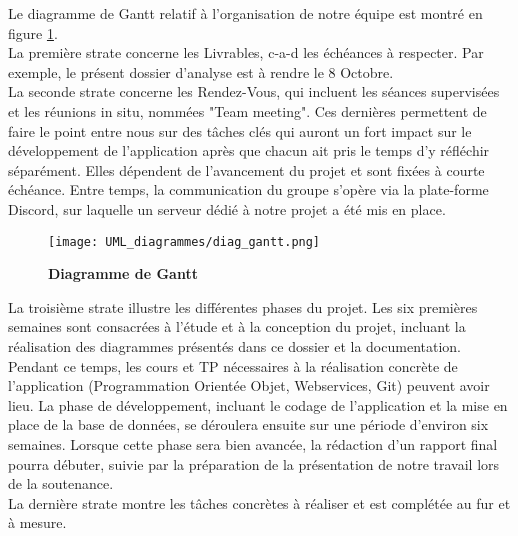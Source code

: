 \documentclass[11pt]{article}
\begin{document}
\bigbreak

Le diagramme de Gantt relatif à l'organisation de notre équipe est montré en figure \ref{UML_gantt}.\\

La première strate concerne les Livrables, c-a-d les échéances à respecter. Par exemple, le présent dossier d'analyse est à rendre le 8 Octobre.\\

La seconde strate concerne les Rendez-Vous, qui incluent les séances supervisées et les réunions in situ, nommées "Team meeting". Ces dernières permettent de faire le point entre nous sur des tâches clés qui auront un fort impact sur le développement de l'application après que chacun ait pris le temps d'y réfléchir séparément. Elles dépendent de l'avancement du projet et sont fixées à courte échéance. Entre temps, la communication du groupe s'opère via la plate-forme Discord, sur laquelle un serveur dédié à notre projet a été mis en place.\\

\begin{figure}[H]
    \caption{\textbf{Diagramme de Gantt}}
    \label{UML_gantt}
    \centering
    \texttt{[image: UML\_diagrammes/diag\_gantt.png]}
\end{figure}

La troisième strate illustre les différentes phases du projet. Les six premières semaines sont consacrées à l'étude et à la conception du projet, incluant la réalisation des diagrammes présentés dans ce dossier et la documentation. Pendant ce temps, les cours et TP nécessaires à la réalisation concrète de l'application (Programmation Orientée Objet, Webservices, Git) peuvent avoir lieu. La phase de développement, incluant le codage de l'application et la mise en place de la base de données, se déroulera ensuite sur une période d'environ six semaines. Lorsque cette phase sera bien avancée, la rédaction d'un rapport final pourra débuter, suivie par la préparation de la présentation de notre travail lors de la soutenance.\\

La dernière strate montre les tâches concrètes à réaliser et est complétée au fur et à mesure.\\





\end{document}
